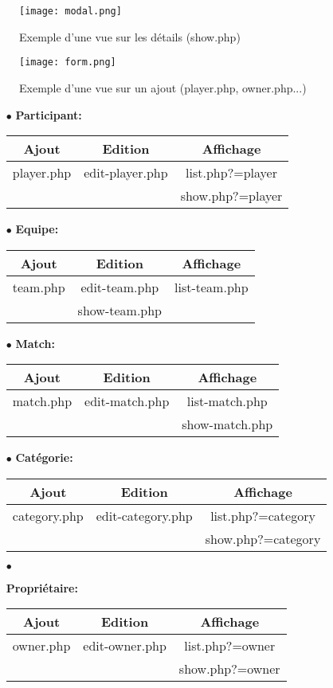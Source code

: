 \documentclass{article}
\begin{document}
\begin{figure}[h!]
\centering
\texttt{[image: modal.png]}
\caption{Exemple d'une vue sur les détails (show.php)}
\end{figure}

\begin{figure}[h!]
\centering
\texttt{[image: form.png]}
\caption{Exemple d'une vue sur un ajout (player.php, owner.php...)}
\end{figure}

\begin{itemize}
\item[$\bullet$]{\textbf{Participant: }}
\begin{tabular}{ccc}
 Ajout & Edition & Affichage \\
 \hline
player.php & edit-player.php & list.php?=player\\
  &  & show.php?=player
\end{tabular}

\item[$\bullet$]{\textbf{Equipe: }}
\begin{tabular}{ccc}
 Ajout & Edition & Affichage \\
 \hline
team.php & edit-team.php & list-team.php\\
  & show-team.php
\end{tabular}

\item[$\bullet$]{\textbf{Match: }}
\begin{tabular}{ccc}
 Ajout & Edition & Affichage \\
 \hline
match.php & edit-match.php & list-match.php\\
  & & show-match.php
\end{tabular}

\item[$\bullet$]{\textbf{Catégorie: }}
\begin{tabular}{ccc}
 Ajout & Edition & Affichage \\
 \hline
category.php & edit-category.php & list.php?=category\\
  &  & show.php?=category
\end{tabular}

\item[$\bullet$]{\textbf{Propriétaire: }
\begin{tabular}{ccc}
 Ajout & Edition & Affichage \\
 \hline
owner.php & edit-owner.php & list.php?=owner\\
  &  & show.php?=owner
\end{tabular}

}
\end{itemize}
\end{document}
